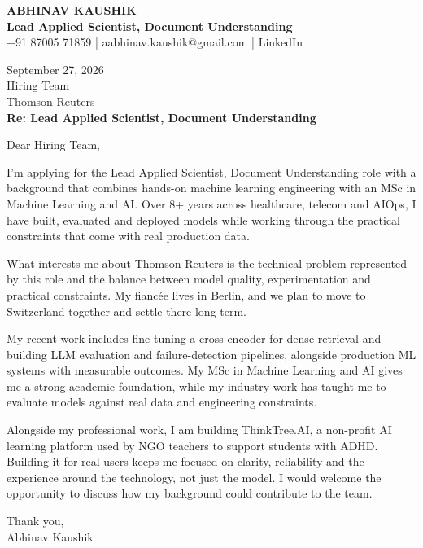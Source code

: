\documentclass[10pt,a4paper]{article}
\begin{document}
\begin{center}
{\Large\bfseries ABHINAV KAUSHIK}\\[2pt]
{\bfseries Lead Applied Scientist, Document Understanding}\\[2pt]
+91 87005 71859 \quad | \quad aabhinav.kaushik@gmail.com \quad | \quad LinkedIn
\end{center}
\vspace{8pt}
September 27, 2026\\[6pt]
Hiring Team\\
Thomson Reuters\\[4pt]
\textbf{Re: Lead Applied Scientist, Document Understanding}

Dear Hiring Team,

I’m applying for the Lead Applied Scientist, Document Understanding role with a background that combines hands-on machine learning engineering with an MSc in Machine Learning and AI. Over 8+ years across healthcare, telecom and AIOps, I have built, evaluated and deployed models while working through the practical constraints that come with real production data.

What interests me about Thomson Reuters is the technical problem represented by this role and the balance between model quality, experimentation and practical constraints. My fiancée lives in Berlin, and we plan to move to Switzerland together and settle there long term.

My recent work includes fine-tuning a cross-encoder for dense retrieval and building LLM evaluation and failure-detection pipelines, alongside production ML systems with measurable outcomes. My MSc in Machine Learning and AI gives me a strong academic foundation, while my industry work has taught me to evaluate models against real data and engineering constraints.

Alongside my professional work, I am building ThinkTree.AI, a non-profit AI learning platform used by NGO teachers to support students with ADHD. Building it for real users keeps me focused on clarity, reliability and the experience around the technology, not just the model. I would welcome the opportunity to discuss how my background could contribute to the team.

Thank you,\\
Abhinav Kaushik
\end{document}
